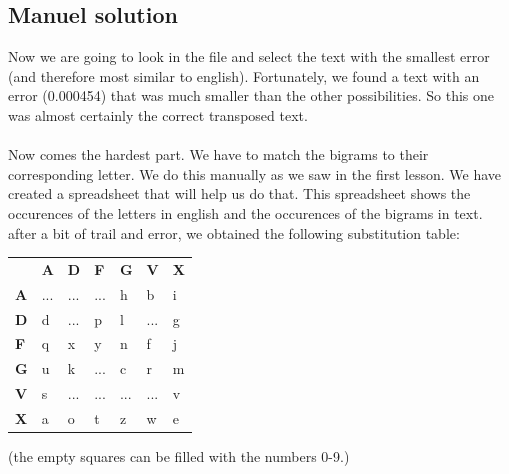 \documentclass{article}
\begin{document}
\subsection{Manuel solution}
Now we are going to look in the file and select the text with the smallest error (and therefore most similar to english). Fortunately, we found a text with an error (0.000454) that was much smaller than the other possibilities. So this one was almost certainly the correct transposed text.\\
\\
Now comes the hardest part. We have to match the bigrams to their corresponding letter. We do this manually as we saw in the first lesson. We have created a spreadsheet that will help us do that. This spreadsheet shows the occurences of the letters in english and the occurences of the bigrams in text.
after a bit of trail and error, we obtained the following substitution table:
\begin{table}[H]
\begin{tabular}{lllllll}
\textbf{} &
  \textbf{A} &
  \textbf{D} &
  \textbf{F} &
  \textbf{G} &
  \textbf{V} &
  \textbf{X} \\ \cline{2-7}
\multicolumn{1}{l|}{\textbf{A}} &
  \multicolumn{1}{l|}{...} &
  \multicolumn{1}{l|}{...} &
  \multicolumn{1}{l|}{...} &
  \multicolumn{1}{l|}{h} &
  \multicolumn{1}{l|}{b} &
  \multicolumn{1}{l|}{i} \\ \cline{2-7}
\multicolumn{1}{l|}{\textbf{D}} &
  \multicolumn{1}{l|}{d} &
  \multicolumn{1}{l|}{...} &
  \multicolumn{1}{l|}{p} &
  \multicolumn{1}{l|}{l} &
  \multicolumn{1}{l|}{...} &
  \multicolumn{1}{l|}{g} \\ \cline{2-7}
\multicolumn{1}{l|}{\textbf{F}} &
  \multicolumn{1}{l|}{q} &
  \multicolumn{1}{l|}{x} &
  \multicolumn{1}{l|}{y} &
  \multicolumn{1}{l|}{n} &
  \multicolumn{1}{l|}{f} &
  \multicolumn{1}{l|}{j} \\ \cline{2-7}
\multicolumn{1}{l|}{\textbf{G}} &
  \multicolumn{1}{l|}{u} &
  \multicolumn{1}{l|}{k} &
  \multicolumn{1}{l|}{...} &
  \multicolumn{1}{l|}{c} &
  \multicolumn{1}{l|}{r} &
  \multicolumn{1}{l|}{m} \\ \cline{2-7}
\multicolumn{1}{l|}{\textbf{V}} &
  \multicolumn{1}{l|}{s} &
  \multicolumn{1}{l|}{...} &
  \multicolumn{1}{l|}{...} &
  \multicolumn{1}{l|}{...} &
  \multicolumn{1}{l|}{...} &
  \multicolumn{1}{l|}{v} \\ \cline{2-7}
\multicolumn{1}{l|}{\textbf{X}} &
  \multicolumn{1}{l|}{a} &
  \multicolumn{1}{l|}{o} &
  \multicolumn{1}{l|}{t} &
  \multicolumn{1}{l|}{z} &
  \multicolumn{1}{l|}{w} &
  \multicolumn{1}{l|}{e} \\ \cline{2-7}
\end{tabular}
\end{table}
(the empty squares can be filled with the numbers 0-9.)
\end{document}
